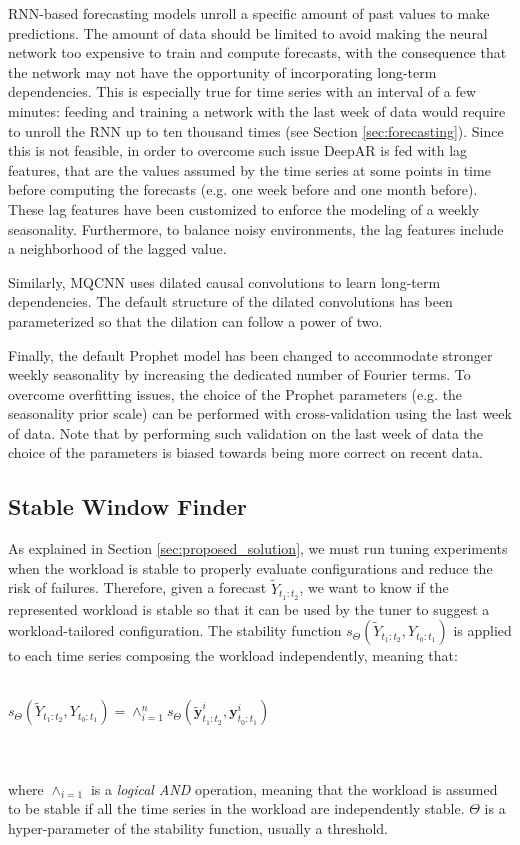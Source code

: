 \documentclass[a4paper, 12pt]{article} %
\begin{document}
	RNN-based forecasting models unroll a specific amount of past values to make predictions. The amount of data should be limited to avoid making the neural network too expensive to train and compute forecasts, with the consequence that the network may not have the opportunity of incorporating long-term dependencies. This is especially true for time series with an interval of a few minutes: feeding and training a network with the last week of data would require to unroll the RNN up to ten thousand times (see Section \ref{sec:forecasting}). Since this is not feasible, in order to overcome such issue DeepAR is fed with lag features, that are the values assumed by the time series at some points in time before computing the forecasts (e.g. one week before and one month before). These lag features have been customized to enforce the modeling of a weekly seasonality. Furthermore, to balance noisy environments, the lag features include a neighborhood of the lagged value.
	
	Similarly, MQCNN uses dilated causal convolutions to learn long-term dependencies. The default structure of the dilated convolutions has been parameterized so  that the dilation can follow a power of two.
	
	Finally, the default Prophet model has been changed to accommodate stronger weekly seasonality by increasing the dedicated number of Fourier terms. To overcome overfitting issues, the choice of the Prophet parameters (e.g. the seasonality prior scale) can be performed with cross-validation using the last week of data. Note that by performing such validation on the last week of data the choice of the parameters is biased towards being more correct on recent data.
	
	\subsection{Stable Window Finder} \label{ssec:stable_window_finder}	
	As explained in Section \ref{sec:proposed_solution}, we must run tuning experiments when the workload is stable to properly evaluate configurations and reduce the risk of failures.
	Therefore, given a forecast $\tilde{Y}_{t_1:t_2}$, we want to know if the represented workload is stable so that it can be used by the tuner to suggest a workload-tailored configuration.
	The stability function $s_\Theta(\tilde{Y}_{t_1:t_2}, Y_{t_0:t_1})$ is applied to each time series composing the workload independently, meaning that:\\\\
	\centerline{
	$
	s_\Theta(\tilde{Y}_{t_1:t_2}, Y_{t_0:t_1}) = \wedge_{i=1} ^n s_\Theta(\tilde{\pmb{y}}_{t_1:t_2}^i, \pmb{y}_{t_0:t_1}^i)
	$
	}\\\\ 
	where $ \wedge_{i=1}$ is a \textit{logical AND} operation, meaning that the workload is assumed to be stable if all the time series in the workload are independently stable. $\Theta$ is a hyper-parameter of the stability function, usually a threshold.
	
\end{document}
